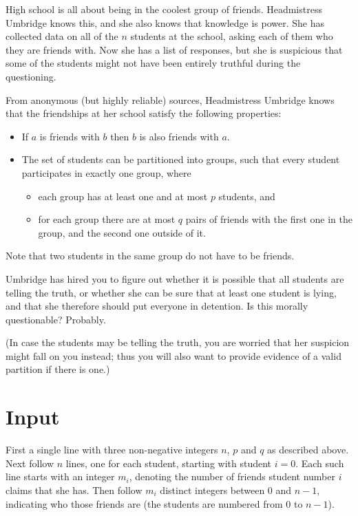 
\noindent
High school is all about being in the coolest group of friends. Headmistress Umbridge knows this, and she also knows that knowledge is power. She has collected data on all of the $n$ students at the school, asking each of them who they are friends with. Now she has a list of responses, but she is suspicious that some of the students might not have been entirely truthful during the questioning. 

From anonymous (but highly reliable) sources, Headmistress Umbridge knows that the friendships at her school satisfy the following properties:
\begin{itemize}
  \item If $a$ is friends with $b$ then $b$ is also friends with $a$.
  \item The set of students can be partitioned into groups, such that every student participates in exactly one group, where
  \begin{itemize}
    \item each group has at least one and at most $p$ students, and
    \item for each group there are at most $q$ pairs of friends with the first one in the group, and the second one outside of it.
  \end{itemize}
\end{itemize}
\noindent
Note that two students in the same group do not have to be friends.

Umbridge has hired you to figure out whether it is possible that all students are telling the truth, or whether she can be sure that at least one student is lying, and that she therefore should put everyone in detention. Is this morally questionable? Probably. 

(In case the students may be telling the truth, you are worried that her suspicion might fall on you instead; thus you will also want to provide evidence of a valid partition if there is one.)

\section*{Input}
First a single line with three non-negative integers $n$, $p$ and $q$ as described above. Next follow $n$ lines, one for each student, starting with student $i=0$. Each such line starts with an integer $m_i$, denoting the number of friends student number $i$ claims that she has. Then follow $m_i$ distinct integers between $0$ and $n-1$, indicating who those friends are (the students are numbered from $0$ to $n-1$). 

